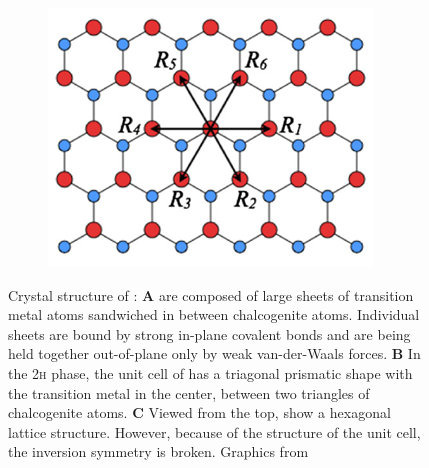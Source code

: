 \begin{figure}[t]
\begin{subfigure}{0.30\textwidth}
		\label{crystal2}
	\end{subfigure}
	\begin{subfigure}{0.30\textwidth}
		\centering
		\caption{}
		\includegraphics[height=.9\textwidth,right]{topview}
		\label{crystal3}
	\end{subfigure}
	\caption{Crystal structure of \tmds\!: \textbf{A} \tmds are composed of large sheets of transition metal atoms sandwiched in between chalcogenite atoms. Individual sheets are bound by strong in-plane covalent bonds and are being held together out-of-plane only by weak van-der-Waals forces. \textbf{B} In the 2\textsc{h} phase, the unit cell of \tmds has a triagonal prismatic shape with the transition metal in the center, between two triangles of chalcogenite atoms. \textbf{C} Viewed from the top, \tmds show a hexagonal lattice structure. However, because of the structure of the unit cell, the inversion symmetry is broken. Graphics from \cite{wang_electronics_2012, xiao_coupled_2012}}\label{crystal}
\end{figure}

